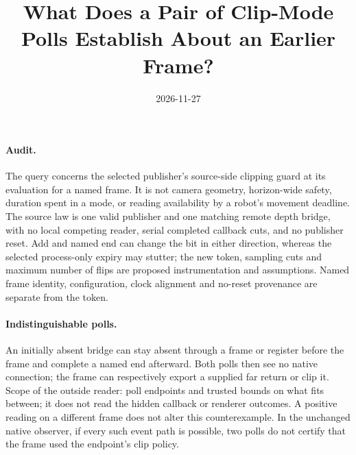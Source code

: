 \documentclass[11pt]{article}
\title{What Does a Pair of Clip-Mode Polls Establish About an Earlier Frame?}
\date{2026-11-27}
\begin{document}
\maketitle

\paragraph{Audit.}
The query concerns the selected publisher's source-side clipping guard
at its evaluation for a named frame. It is not camera geometry,
horizon-wide safety, duration spent in a mode, or reading availability
by a robot's movement deadline. The source law is one valid publisher
and one matching remote depth bridge, with no local competing reader,
serial completed callback cuts, and no publisher reset. Add and named
end can change the bit in either direction, whereas the selected
process-only expiry may stutter; the new token, sampling cuts and
maximum number of flips are proposed instrumentation and assumptions.
Named frame identity, configuration, clock alignment and no-reset
provenance are separate from the token.

\paragraph{Indistinguishable polls.}
An initially absent bridge can stay absent through a frame or register
before the frame and complete a named end afterward. Both polls then
see no native connection; the frame can respectively export a supplied
far return or clip it. Scope of the outside reader: poll endpoints
and trusted bounds on what fits between; it does not read the hidden
callback or renderer outcomes. A positive reading on a different frame
does not alter this counterexample. In the unchanged native observer,
if every such event path is possible, two polls do not certify that the
frame used the endpoint's clip policy.
\end{document}
